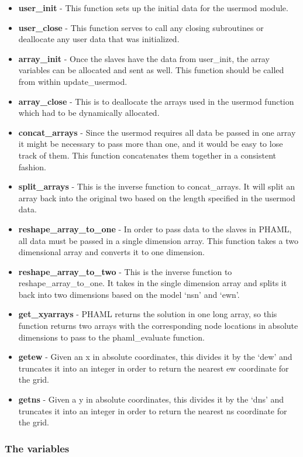 \begin{itemize}
\item \textbf{user\_init} - This function sets up the initial data for the usermod module.
\item \textbf{user\_close} - This function serves to call any closing subroutines or deallocate any user data that was initialized.
\item \textbf{array\_init} - Once the slaves have the data from user\_init, the array variables can be allocated and sent as well.  This function should be called from within update\_usermod.
\item \textbf{array\_close} - This is to deallocate the arrays used in the usermod function which had to be dynamically allocated.
\item \textbf{concat\_arrays} - Since the usermod requires all data be passed in one array it might be necessary to pass more than one, and it would be easy to lose track of them.  This function concatenates them together in a consistent fashion.
\item \textbf{split\_arrays} - This is the inverse function to concat\_arrays.  It will split an array back into the original two based on the length specified in the usermod data. 
\item \textbf{reshape\_array\_to\_one} - In order to pass data to the slaves in PHAML, all data must be passed in a single dimension array.  This function takes a two dimensional array and converts it to one dimension.
\item \textbf{reshape\_array\_to\_two} - This is the inverse function to reshape\_array\_to\_one.  It takes in the single dimension array and splits it back into two dimensions based on the model `nsn' and `ewn'.
\item \textbf{get\_xyarrays} - PHAML returns the solution in one long array, so this function returns two arrays with the corresponding node locations in absolute dimensions to pass to the phaml\_evaluate function.
\item \textbf{getew} - Given an x in absolute coordinates, this divides it by the `dew' and truncates it into an integer in order to return the nearest ew coordinate for the grid.
\item \textbf{getns} - Given a y in absolute coordinates, this divides it by the `dns' and truncates it into an integer in order to return the nearest ns coordinate for the grid.
\end{itemize}

\subsubsection{The variables}

